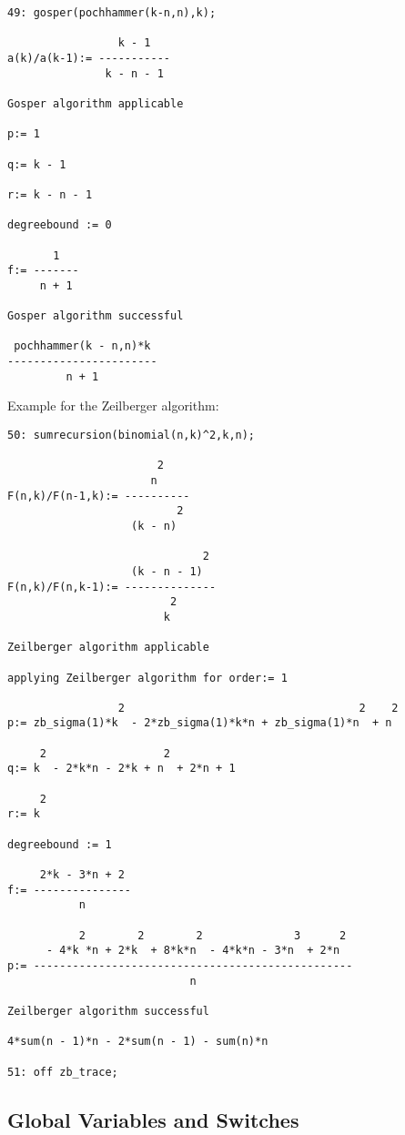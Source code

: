 {\small
\begin{verbatim}
49: gosper(pochhammer(k-n,n),k);

                 k - 1
a(k)/a(k-1):= -----------
               k - n - 1

Gosper algorithm applicable

p:= 1

q:= k - 1

r:= k - n - 1

degreebound := 0

       1
f:= -------
     n + 1

Gosper algorithm successful

 pochhammer(k - n,n)*k
-----------------------
         n + 1
\end{verbatim}
}
Example for the Zeilberger algorithm:
{\small%
\begin{verbatim}
50: sumrecursion(binomial(n,k)^2,k,n);

                       2
                      n
F(n,k)/F(n-1,k):= ----------
                          2
                   (k - n)

                              2
                   (k - n - 1)
F(n,k)/F(n,k-1):= --------------
                         2
                        k

Zeilberger algorithm applicable

applying Zeilberger algorithm for order:= 1

                 2                                    2    2
p:= zb_sigma(1)*k  - 2*zb_sigma(1)*k*n + zb_sigma(1)*n  + n

     2                  2
q:= k  - 2*k*n - 2*k + n  + 2*n + 1

     2
r:= k

degreebound := 1

     2*k - 3*n + 2
f:= ---------------
           n

           2        2        2              3      2
      - 4*k *n + 2*k  + 8*k*n  - 4*k*n - 3*n  + 2*n
p:= -------------------------------------------------
                            n

Zeilberger algorithm successful

4*sum(n - 1)*n - 2*sum(n - 1) - sum(n)*n

51: off zb_trace;
\end{verbatim}
}\noindent

\subsection{Global Variables and Switches}

